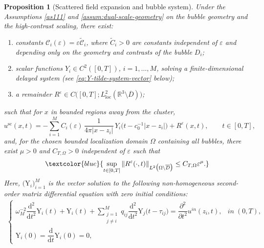 \documentclass[11pt,a4paper]{article}
\numberwithin{equation}{section}
\newtheorem{proposition}[theorem]{Proposition}
\newcommand{\R}{\mathbb{R}}
\newcommand{\norm}[1]{\left\lVert #1 \right\rVert}
\begin{document}
\begin{proposition}[Scattered field expansion and bubble system]
\label{prop:MS-expansion}
Under the Assumptions \ref{as111} and  \ref{assum:dual-scale-geometry} on the bubble geometry and the high-contrast scaling, there exist:
\begin{enumerate}
  \item constants $\mathcal{C}_i(\varepsilon)=\varepsilon \tilde{\mathcal{C}}_i$, where $\tilde{C}_i>0$ are constants independent of $\varepsilon$ and depending only on the geometry and contrasts of the bubble $D_i$;
  \item scalar functions $Y_i\in C^2([0,T])$, $i=1,\dots,M$, solving a finite-dimensional delayed system (see \eqref{eq:Y-tilde-system-vector} below);
  \item a remainder $R^\varepsilon\in C\big([0,T];L^2_{\mathrm{loc}}(\R^3\setminus \overline{D})\big)$;
\end{enumerate}
such that for $x$ in bounded regions away from the cluster,
\begin{equation}
\label{eq:MS-expansion-again}
 u^{\mathrm{sc}}(x,t)
 =
 -\sum_{i=1}^M C_i(\varepsilon)\,
 \frac{1}{4\pi|x-z_i|}
 \,Y_i\bigl(t-c_0^{-1}|x-z_i|\bigr)
 + R^\varepsilon(x,t),
 \qquad t\in[0,T],
\end{equation}
and, for the chosen bounded localization domain $\Omega$ containing all bubbles, there exist $\mu>0$ and $C_{T,\Omega}>0$ independent of $\varepsilon$ such that
\begin{equation}
\label{eq:R-eps-estimate-again}
 \textcolor{blue}{\sup_{t\in[0,T]}\norm{R^\varepsilon(\cdot,t)}_{L^2\big(\Omega\setminus \overline{D}\big)}
 \le C_{T,\Omega}\varepsilon^\mu.}
\end{equation}
Here, $\big(\mathrm{Y}_i\big)_{i=1}^M$ is the vector solution to the following non-homogeneous second-order matrix differential equation with zero initial conditions:
\begin{align}
\label{eq:Y-tilde-system}
    \begin{cases}
        \omega_M^{-2} \dfrac{\mathrm{d}^2}{\mathrm{d} t^2} \mathrm{Y}_i(t) + \mathrm{Y}_i(t) + \sum\limits_{\substack{j=1 \\ j \neq i}}^M q_{ij} \dfrac{\mathrm{d}^2}{\mathrm{d} t^2} \mathrm{Y}_j\bigl(t - \tau_{ij}\bigr) = \dfrac{\partial^2}{\partial t^2} u^\textit{in}(z_i,t), &\textit{in} \; (0, T), \\
        \mathrm{Y}_i(0) = \dfrac{\mathrm{d}}{\mathrm{d} t} \mathrm{Y}_i(0) = 0,
    \end{cases}

\end{align}
\end{proposition}
\end{document}

